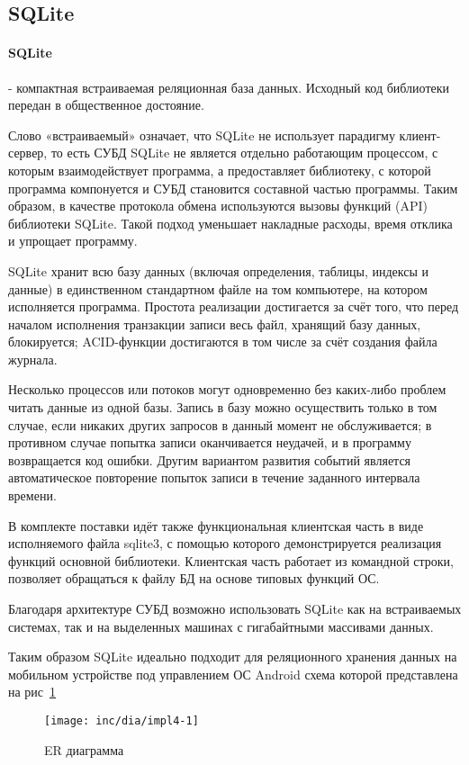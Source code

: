 \subsection{SQLite}
\paragraph{SQLite} - компактная встраиваемая реляционная база данных. Исходный код библиотеки передан в общественное достояние.

Слово «встраиваемый» означает, что SQLite не использует парадигму клиент-сервер, то есть СУБД SQLite не является отдельно работающим процессом, с которым взаимодействует программа, а предоставляет библиотеку, с которой программа компонуется и СУБД становится составной частью программы. Таким образом, в качестве протокола обмена используются вызовы функций (API) библиотеки SQLite. Такой подход уменьшает накладные расходы, время отклика и упрощает программу.

SQLite хранит всю базу данных (включая определения, таблицы, индексы и данные) в единственном стандартном файле на том компьютере, на котором исполняется программа. Простота реализации достигается за счёт того, что перед началом исполнения транзакции записи весь файл, хранящий базу данных, блокируется; ACID-функции достигаются в том числе за счёт создания файла журнала.

Несколько процессов или потоков могут одновременно без каких-либо проблем читать данные из одной базы. Запись в базу можно осуществить только в том случае, если никаких других запросов в данный момент не обслуживается; в противном случае попытка записи оканчивается неудачей, и в программу возвращается код ошибки. Другим вариантом развития событий является автоматическое повторение попыток записи в течение заданного интервала времени.

В комплекте поставки идёт также функциональная клиентская часть в виде исполняемого файла sqlite3, с помощью которого демонстрируется реализация функций основной библиотеки. Клиентская часть работает из командной строки, позволяет обращаться к файлу БД на основе типовых функций ОС.

Благодаря архитектуре СУБД возможно использовать SQLite как на встраиваемых системах, так и на выделенных машинах с гигабайтными массивами данных.

Таким образом SQLite идеально подходит для реляционного хранения данных на мобильном устройстве под управлением ОС Android схема которой представлена на рис~\ref{fig:fig25}
\begin{figure}[ht!]
  \centering
  \texttt{[image: inc/dia/impl4-1]}
  \caption{ER диаграмма}
  \label{fig:fig25}
\end{figure}



